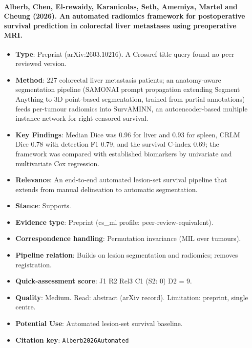 \documentclass[journal,onecolumn]{IEEEtran}
\begin{document}
\paragraph{Alberb, Chen, El-rewaidy, Karanicolas, Seth, Amemiya, Martel and Cheung (2026). An automated radiomics framework for postoperative survival prediction in colorectal liver metastases using preoperative MRI.~\cite{Alberb2026Automated}}\mbox{}

\begin{itemize}

\item{} \textbf{Type}: Preprint (arXiv:2603.10216). A Crossref title query found no peer-reviewed version.

\item{} \textbf{Method}: 227 colorectal liver metastasis patients; an anatomy-aware segmentation pipeline (SAMONAI prompt propagation extending Segment Anything to 3D point-based segmentation, trained from partial annotations) feeds per-tumour radiomics into SurvAMINN, an autoencoder-based multiple instance network for right-censored survival.

\item{} \textbf{Key Findings}: Median Dice was 0.96 for liver and 0.93 for spleen, CRLM Dice 0.78 with detection F1 0.79, and the survival C-index 0.69; the framework was compared with established biomarkers by univariate and multivariate Cox regression.

\item{} \textbf{Relevance}: An end-to-end automated lesion-set survival pipeline that extends \cite{Chen2021AMINN} from manual delineation to automatic segmentation.

\item{} \textbf{Stance}: Supports.

\item{} \textbf{Evidence type}: Preprint (cs\_ml profile: peer-review-equivalent).

\item{} \textbf{Correspondence handling}: Permutation invariance (MIL over tumours).

\item{} \textbf{Pipeline relation}: Builds on lesion segmentation and radiomics; removes registration.

\item{} \textbf{Quick-assessment score}: J1 R2 Rel3 C1 (S2: 0) D2 = 9.

\item{} \textbf{Quality}: Medium. Read: abstract (arXiv record). Limitation: preprint, single centre.

\item{} \textbf{Potential Use}: Automated lesion-set survival baseline.

\item{} \textbf{Citation key}: \texttt{Alberb2026Automated}

\end{itemize}
\end{document}
